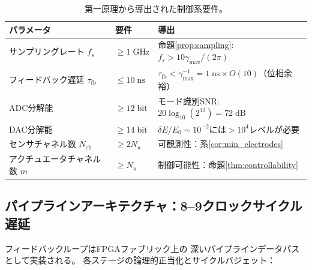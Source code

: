\documentclass[12pt,twocolumn]{ltjsarticle}
\begin{document}
\begin{table}[t]
\centering
\caption{第一原理から導出された制御系要件。}
\label{tab:requirements}
\begin{tabular}{@{}llp{5.5cm}@{}}
\toprule
\textbf{パラメータ} & \textbf{要件} & \textbf{導出} \\
\midrule
サンプリングレート $f_s$
  & $\geq 1\;\mathrm{GHz}$
  & 命題\ref{prop:sampling}: $f_s > 10\gamma_{\max}/(2\pi)$ \\
フィードバック遅延 $\tau_{\mathrm{fb}}$
  & $\leq 10\;\mathrm{ns}$
  & $\tau_{\mathrm{fb}} < \gamma_{\max}^{-1} = 1\;\mathrm{ns}
    \times O(10)$（位相余裕） \\
ADC分解能
  & $\geq 12\;\mathrm{bit}$
  & モード識別SNR: $20\log_{10}(2^{12}) = 72\;\mathrm{dB}$ \\
DAC分解能
  & $\geq 14\;\mathrm{bit}$
  & $\delta E/E_0 \sim 10^{-2}$には$> 10^{4}$レベルが必要 \\
センサチャネル数 $N_{\mathrm{ch}}$
  & $\geq 2 N_u$
  & 可観測性：系\ref{cor:min_electrodes} \\
アクチュエータチャネル数 $m$
  & $\geq N_u$
  & 制御可能性：命題\ref{thm:controllability} \\
\bottomrule
\end{tabular}
\end{table}

\subsection{パイプラインアーキテクチャ：8--9クロックサイクル遅延}
\label{sec:fpga:pipeline}

フィードバックループはFPGAファブリック上の
深いパイプラインデータパスとして実装される。
各ステージの論理的正当化とサイクルバジェット：
\end{document}
